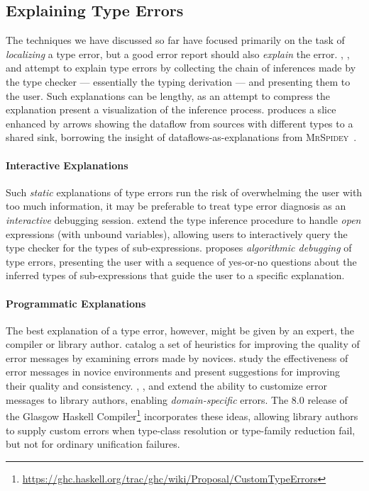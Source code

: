 \subsection{Explaining Type Errors}
\label{sec:explaining-type-errors}
The techniques we have discussed so far have focused primarily on the
task of \emph{localizing} a type error, but a good error report should
also \emph{explain} the error.
%
\citet{Wand1986-nw}, \citet{Beaven1993-hb}, and \citet{Duggan1996-by}
attempt to explain type errors by collecting the chain of inferences
made by the type checker --- essentially the typing derivation ---
and presenting them to the user.
%
Such explanations can be lengthy, as an attempt to compress the
explanation \citet{Yang2000-kz} present a visualization of the
inference process.
%
\citet{Gast2004-zd} produces a slice enhanced by arrows
showing the dataflow from sources with different types to a
shared sink, borrowing the insight of dataflows-as-explanations from
\textsc{MrSpidey}~\citep{Flanagan1996-bu}.
%

\paragraph{Interactive Explanations}
Such \emph{static} explanations of type errors run the risk of
overwhelming the user with too much information, it may be preferable to
treat type error diagnosis as an \emph{interactive} debugging session.
%
\citet{Bernstein1995-yj} extend the type inference procedure to handle
\emph{open} expressions (\ie with unbound variables), allowing users to
interactively query the type checker for the types of sub-expressions.
%
\citet{Chitil2001-td} proposes \emph{algorithmic debugging} of type
errors, presenting the user with a sequence of yes-or-no questions about
the inferred types of sub-expressions that guide the user to a specific
explanation.

\paragraph{Programmatic Explanations}
%
The best explanation of a type error, however, might be given by an
expert, \eg the compiler or library author.
%
\citet{Hage2006-hc} catalog a set of heuristics for
improving the quality of error messages by examining errors made by
novices.
%
\citet{Marceau2011-ok,Marceau2011-cy} study the effectiveness of error
messages in novice environments and present suggestions for improving
their quality and consistency.
%
\citet{Heeren2003-db}, \citet{Christiansen2014-qc}, and
\citet{Serrano2016-oo} extend the ability to customize error messages to
library authors, enabling \emph{domain-specific} errors.
%
The 8.0 release of the
Glasgow Haskell Compiler\footnote{\url{https://ghc.haskell.org/trac/ghc/wiki/Proposal/CustomTypeErrors}}
incorporates these ideas, allowing library authors to supply
custom errors when type-class resolution or type-family reduction fail,
but not for ordinary unification failures.

